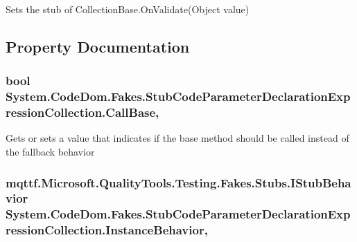 Sets the stub of Collection\-Base.\-On\-Validate(\-Object value)



\subsection{Property Documentation}
\hypertarget{class_system_1_1_code_dom_1_1_fakes_1_1_stub_code_parameter_declaration_expression_collection_a6cb2ef91d590a4c6093cd21e4161a4ae}{
\subsubsection[{Call\-Base}]{\setlength{\rightskip}{0pt plus 5cm}bool System.\-Code\-Dom.\-Fakes.\-Stub\-Code\-Parameter\-Declaration\-Expression\-Collection.\-Call\-Base\hspace{0.3cm}{\ttfamily [get]}, {\ttfamily [set]}}}\label{class_system_1_1_code_dom_1_1_fakes_1_1_stub_code_parameter_declaration_expression_collection_a6cb2ef91d590a4c6093cd21e4161a4ae}


Gets or sets a value that indicates if the base method should be called instead of the fallback behavior

\hypertarget{class_system_1_1_code_dom_1_1_fakes_1_1_stub_code_parameter_declaration_expression_collection_ac08a4921ea4f93bba576f4ff62b75c91}{
\subsubsection[{Instance\-Behavior}]{\setlength{\rightskip}{0pt plus 5cm}mqttf.\-Microsoft.\-Quality\-Tools.\-Testing.\-Fakes.\-Stubs.\-I\-Stub\-Behavior System.\-Code\-Dom.\-Fakes.\-Stub\-Code\-Parameter\-Declaration\-Expression\-Collection.\-Instance\-Behavior\hspace{0.3cm}{\ttfamily [get]}, {\ttfamily [set]}}}\label{class_system_1_1_code_dom_1_1_fakes_1_1_stub_code_parameter_declaration_expression_collection_ac08a4921ea4f93bba576f4ff62b75c91}


